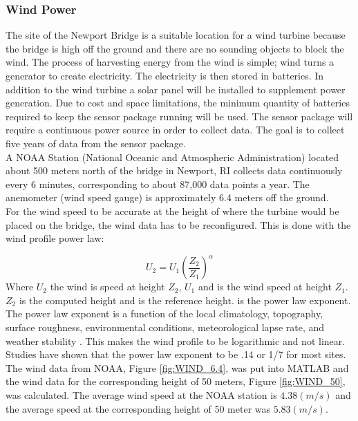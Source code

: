 \subsubsection{Wind Power}
\indent The site of the Newport Bridge is a suitable location for a
wind turbine because the bridge is high off the ground and there
are no sounding objects to block the wind. The process of
harvesting energy from the wind is simple; wind turns a generator
to create electricity. The electricity is then stored in
batteries. In addition to the wind turbine a solar panel will
be installed to supplement power generation. Due to cost and
space limitations, the minimum quantity of batteries required
to keep the sensor package running will be used. The sensor
 package will require a continuous power source in order to
  collect data. The goal is to collect five years of data
   from the sensor package. \\   
   
\indent A NOAA Station  (National Oceanic and Atmospheric
Administration) located about 500 meters north of the bridge in
Newport, RI collects data continuously every 6 minutes,
corresponding to about 87,000 data points a year. The anemometer
(wind speed gauge) is approximately 6.4 meters off the ground.\\    
\indent For the wind speed to be accurate at the height of where the
turbine would be placed on the bridge, the wind data has to be
reconfigured. This is done with the wind profile power law: 

\begin{equation}
U_{2} = U_{1}(\frac{Z_{2}}{Z_{1}})^\alpha
\label{eqn:WIND_Power_Law}
\end{equation}
Where $U_{2}$ the wind is speed at height $Z_{2}$, $U_{1}$ and is
the wind speed at height $Z_{1}$. $Z_{2}$ is the computed height
and is the reference height. is the power law exponent. The power
law exponent is a function of the local climatology, topography,
surface roughness, environmental conditions, meteorological
lapse rate, and weather stability \cite{Zekai}. This makes the
wind profile to be logarithmic and not linear. Studies have
shown that the power law exponent to be .14 or 1/7 for most
sites. The wind data from NOAA, Figure \ref{fig:WIND_6.4},
 was put into MATLAB and the wind data for the corresponding
  height of 50 meters, Figure \ref{fig:WIND_50}, was
   calculated. The average wind speed at the NOAA station is
    $4.38 (m/s)$ and the average speed at the corresponding
     height of 50 meter was $5.83(m/s)$.


